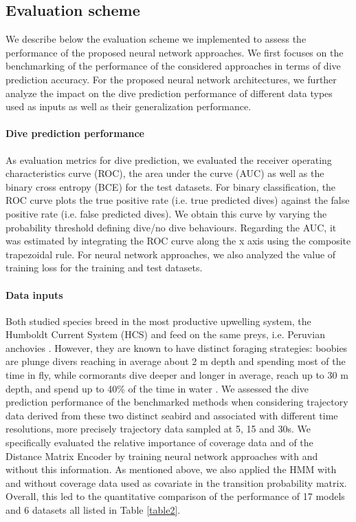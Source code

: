 \documentclass{article}
\begin{document}
\subsection{Evaluation scheme}
We describe below the evaluation scheme we implemented to assess the performance of the proposed neural network approaches. We first focuses on the benchmarking of the performance of the considered approaches in terms of dive prediction accuracy. For the proposed neural network architectures, we further analyze the impact on the dive prediction performance of different data types used as inputs as well as their generalization performance.

\paragraph{Dive prediction performance}
As evaluation metrics for dive prediction, we evaluated the receiver operating characteristics curve (ROC), the area under the curve (AUC) as well as the binary cross entropy (BCE) for the test datasets.
For binary classification, the ROC curve plots the true positive rate (i.e. true predicted dives) against the false positive rate (i.e. false predicted dives). We obtain this curve by varying the probability threshold defining dive/no dive behaviours. Regarding the AUC, it was estimated by integrating the ROC curve along the x axis using the composite trapezoidal rule. For neural network approaches, we also analyzed the value of training loss for the training and test datasets.

\paragraph{Data inputs}
Both studied species breed in the most productive upwelling system, the Humboldt Current System (HCS) and feed on the same preys, i.e. Peruvian anchovies \cite{jahncke_diets_1998}. However, they are known to have distinct foraging strategies: boobies are plunge divers reaching in average about 2 m depth and spending most of the time in fly, while cormorants dive deeper and longer in average, reach up to 30 m depth, and spend up to 40\% of the time in water \cite{weimerskirch_foraging_2012}.
We assessed the dive prediction performance of the benchmarked methods when considering trajectory data derived from these two distinct seabird and associated with different time resolutions, more precisely trajectory data sampled at 5, 15 and 30s.
We specifically evaluated the relative importance of coverage data and of the Distance Matrix Encoder by training neural network approaches with and without this information. As mentioned above, we also applied the HMM with and without coverage data used as covariate in the transition probability matrix.
Overall, this led to the quantitative comparison of the performance of 17 models and 6 datasets all listed in Table \ref{table2}.
\end{document}
